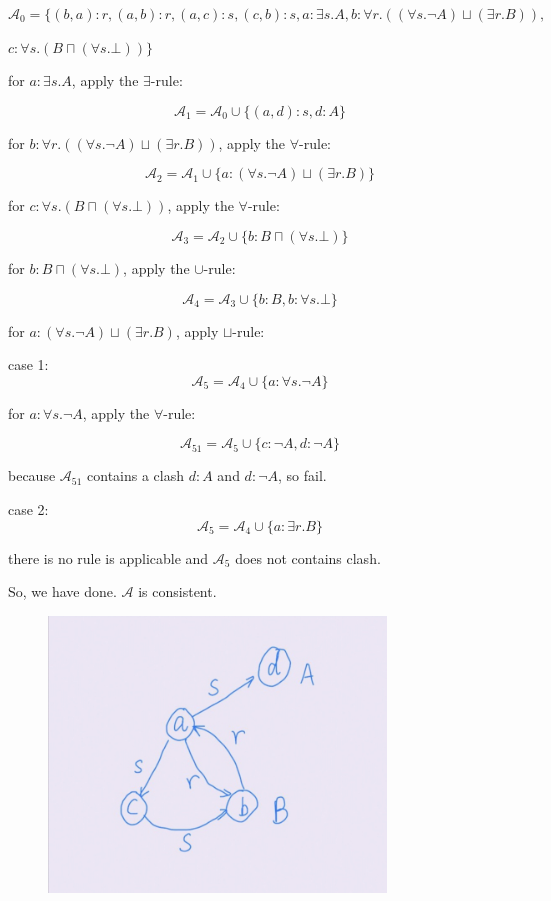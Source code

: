 \documentclass[12pt]{article}
\begin{document}
    $\mathcal{A}_0 = \{ (b,a): r, (a,b): r, (a,c): s, (c,b):s, a: \exists s.A,  b: \forall r.((\forall s.\lnot A)\sqcup (\exists r.B)), $\par
    $c: \forall s.(B \sqcap (\forall s.\bot)) \}$ \par
    for $a: \exists s.A$, apply the $\exists$-rule: \par
    $$\mathcal{A}_1 = \mathcal{A}_0 \cup \{ (a,d): s, d: A \}$$\par
    for $b: \forall r.((\forall s.\lnot A)\sqcup (\exists r.B))$, apply the $\forall$-rule:\par
    $$\mathcal{A}_2 = \mathcal{A}_1 \cup \{ a: (\forall s.\lnot A)\sqcup (\exists r.B) \}$$\par
    for $c: \forall s.(B \sqcap (\forall s.\bot))$, apply the $\forall$-rule:\par
    $$\mathcal{A}_3 = \mathcal{A}_2 \cup \{ b: B \sqcap (\forall s.\bot) \}$$\par
    for $b: B \sqcap (\forall s.\bot)$, apply the $\cup$-rule:\par
    $$\mathcal{A}_4 = \mathcal{A}_3 \cup \{ b: B, b: \forall s.\bot \}$$\par
    for $a: (\forall s.\lnot A)\sqcup (\exists r.B)$, apply $\sqcup$-rule:\par
    case 1: $$\mathcal{A}_5 = \mathcal{A}_4 \cup \{ a: \forall s.\lnot A \}$$\par
    \quad\quad for $a: \forall s.\lnot A$, apply the $\forall$-rule:\par
    \quad\quad $$\mathcal{A}_{51} = \mathcal{A}_5 \cup \{ c: \lnot A, d: \lnot A \}$$ \par
    \quad\quad because $\mathcal{A}_{51}$ contains a clash $d: A$ and $d: \lnot A$, so fail.\par
    case 2: $$\mathcal{A}_5 = \mathcal{A}_4 \cup \{ a: \exists r.B\}$$\par
    \quad\quad there is no rule is applicable and $\mathcal{A}_5$ does not contains clash.\par
    So, we have done. $\mathcal{A}$ is consistent.
    \begin{figure}[htbp]
		\centering
		\includegraphics[width=0.8\textwidth,height=0.5\textwidth]{hw2_8.jpg}
	\end{figure} 
\end{document}
